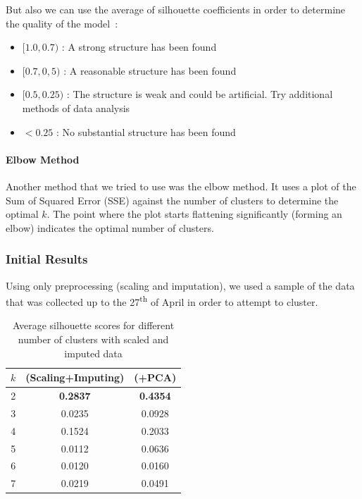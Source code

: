 But also we can use the average of silhouette coefficients in order to determine the quality of the model~\cite{silhouette}:
\begin{itemize}[topsep=0pt,noitemsep]
	\item $[1.0,0.7)$ : A strong structure has been found
	\item $[0.7,0,5)$ : A reasonable structure has been found
	\item $[0.5,0.25)$ : The structure is weak and could be artificial. Try additional methods of data analysis
	\item $< 0.25$ : No substantial structure has been found
\end{itemize}

\paragraph{Elbow Method}
Another method that we tried to use was the elbow method. It uses a plot of the Sum of Squared Error (SSE) against the number of clusters to determine the optimal $k$. The point where the plot starts flattening significantly (forming an elbow) indicates the optimal number of clusters. 

\subsubsection{Initial Results}
Using only preprocessing (scaling and imputation), we used a sample of the data that was collected up to the 27\textsuperscript{th} of April in order to attempt to cluster. 

\begin{table}[h]
\begin{center}
\begin{tabular}{c c c}
\hline
\textbf{$k$} & \textbf{(Scaling+Imputing)} & \textbf{(+PCA)}\\ 
\hline\hline
2 & \textbf{0.2837} & \textbf{0.4354}\\
3 & 0.0235 & 0.0928\\
4 & 0.1524 & 0.2033\\
5 & 0.0112 & 0.0636\\
6 & 0.0120 & 0.0160\\
7 & 0.0219 & 0.0491\\
\end{tabular}
\end{center}
\caption{\label{silh_scor_simple}Average silhouette scores for different number of clusters with scaled and imputed data}
\end{table}

